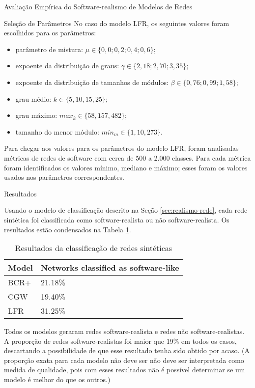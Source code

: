\begin{section}{Avaliação Empírica do Software-realismo de Modelos de Redes}
\begin{subsection}{Seleção de Parâmetros}
No caso do modelo LFR, os seguintes valores foram escolhidos para os parâmetros:

\begin{itemize}
	\item parâmetro de mistura: $\mu \in \{0,0; 0,2; 0,4; 0,6\}$;
	\item expoente da distribuição de graus: $\gamma \in \{2,18; 2,70; 3,35\}$;
	\item expoente da distribuição de tamanhos de módulos: $\beta \in \{0,76; 0,99; 1,58\}$;
	\item grau médio: $k \in \{5, 10, 15, 25\}$;
	\item grau máximo: $max_k \in \{58, 157, 482\}$;
	\item tamanho do menor módulo: $min_m \in \{1, 10, 273\}$.
\end{itemize}

Para chegar aos valores para os parâmetros do modelo LFR, foram analisadas métricas de redes de software com cerca de 500 a 2.000 classes. Para cada métrica foram identificados os valores mínimo, mediano e máximo; esses foram os valores usados nos parâmetros correspondentes.
\end{subsection}

\begin{subsection}{Resultados}

Usando o modelo de classificação descrito na Seção \ref{sec:realismo-rede}, cada rede sintética foi classificada como software-realista ou não software-realista. Os resultados estão condensados na Tabela \ref{tab:results}.

\begin{table}
\caption{Resultados da classificação de redes sintéticas}
\centering
\begin{tabular}{|l|l|}
\hline
Model & Networks classified as software-like \\
\hline 
\hline
BCR+ & 21.18\% \\ %
\hline
CGW  & 19.40\% \\  %
\hline
LFR  & 31.25\% \\ %
\hline
\end{tabular}
\label{tab:results}
\end{table}

Todos os modelos geraram redes software-realista e redes não software-realistas. A proporção de redes software-realistas foi maior que 19\% em todos os casos, descartando a possibilidade de que esse resultado tenha sido obtido por acaso. (A proporção exata para cada modelo não deve ser não deve ser interpretada como medida de qualidade, pois com esses resultados não é possível determinar se um modelo é melhor do que os outros.)


\end{subsection}
\end{section}
